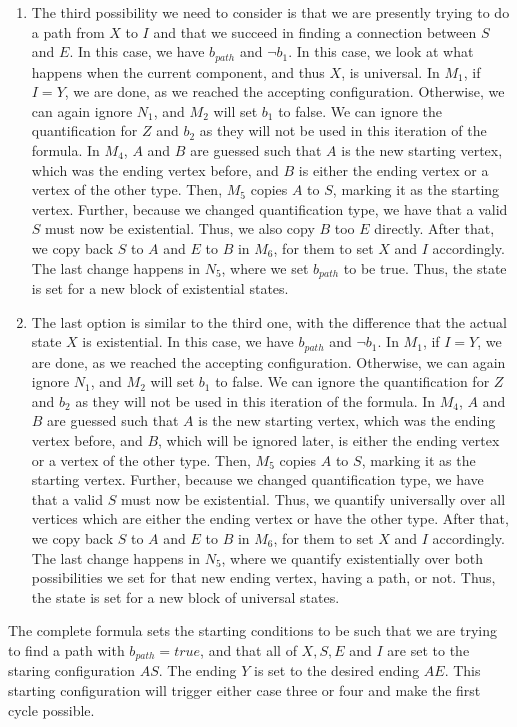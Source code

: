 \begin{enumerate}
    \item The third possibility we need to consider is that we are presently trying to do a path from $X$ to $I$ and that we succeed in finding a connection between $S$ and $E$.
    In this case, we have $b_{path}$ and $\neg b_1$.
    In this case, we look at what happens when the current component, and thus $X$, is universal.
    In $M_1$, if $I = Y$, we are done, as we reached the accepting configuration.
    Otherwise, we can again ignore $N_1$, and $M_2$ will set $b_1$ to false.
    We can ignore the quantification for $Z$ and $b_2$ as they will not be used in this iteration of the formula.
    In $M_4$, $A$ and $B$ are guessed such that $A$ is the new starting vertex, which was the ending vertex before, and $B$ is either the ending vertex or a vertex of the other type.
    Then, $M_5$ copies $A$ to $S$, marking it as the starting vertex.
    Further, because we changed quantification type, we have that a valid $S$ must now be existential.
    Thus, we also copy $B$ too $E$ directly.
    After that, we copy back $S$ to $A$ and $E$ to $B$ in $M_6$, for them to set $X$ and $I$ accordingly.
    The last change happens in $N_{5}$, where we set $b_{path}$ to be true.
    Thus, the state is set for a new block of existential states.

    \item The last option is similar to the third one, with the difference that the actual state $X$ is existential.
    In this case, we have $b_{path}$ and $\neg b_1$.
    In $M_1$, if $I = Y$, we are done, as we reached the accepting configuration.
    Otherwise, we can again ignore $N_1$, and $M_2$ will set $b_1$ to false.
    We can ignore the quantification for $Z$ and $b_2$ as they will not be used in this iteration of the formula.
    In $M_4$, $A$ and $B$ are guessed such that $A$ is the new starting vertex, which was the ending vertex before, and $B$, which will be ignored later, is either the ending vertex or a vertex of the other type.
    Then, $M_5$ copies $A$ to $S$, marking it as the starting vertex.
    Further, because we changed quantification type, we have that a valid $S$ must now be existential.
    Thus, we quantify universally over all vertices which are either the ending vertex or have the other type.
    After that, we copy back $S$ to $A$ and $E$ to $B$ in $M_6$, for them to set $X$ and $I$ accordingly.
    The last change happens in $N_{5}$, where we quantify existentially over both possibilities we set for that new ending vertex, having a path, or not.
    Thus, the state is set for a new block of universal states.
\end{enumerate}
The complete formula sets the starting conditions to be such that we are trying to find a path with $b_{path} = true$, and that all of $X, S, E$ and $I$ are set to the staring configuration $AS$.
The ending $Y$ is set to the desired ending $AE$.
This starting configuration will trigger either case three or four and make the first cycle possible.

